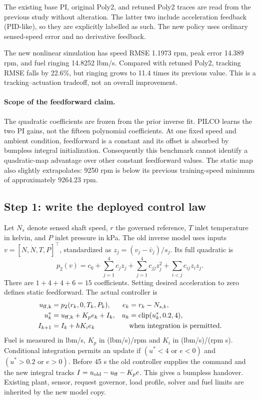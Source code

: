 The existing base PI, original Poly2, and retuned Poly2 traces are read from the previous study without alteration. The latter two include acceleration feedback (PID-like), so they are explicitly labelled as such. The new policy uses ordinary sensed-speed error and no derivative feedback.

The new nonlinear simulation has speed RMSE 1.1973 rpm, peak error 14.389 rpm, and fuel ringing 14.8252 lbm/s. Compared with retuned Poly2, tracking RMSE falls by 22.6\%, but ringing grows to 11.4 times its previous value. This is a tracking--actuation tradeoff, not an overall improvement.

\paragraph{Scope of the feedforward claim.} The quadratic coefficients are frozen from the prior inverse fit. PILCO learns the two PI gains, not the fifteen polynomial coefficients. At one fixed speed and ambient condition, feedforward is a constant and its offset is absorbed by bumpless integral initialization. Consequently this benchmark cannot identify a quadratic-map advantage over other constant feedforward values. The static map also slightly extrapolates: 9250 rpm is below its previous training-speed minimum of approximately 9264.23 rpm.

\subsection{Step 1: write the deployed control law}
Let $N_s$ denote sensed shaft speed, $r$ the governed reference, $T$ inlet temperature in kelvin, and $P$ inlet pressure in kPa. The old inverse model uses inputs $v=[N,\dot N,T,P]^\top$, standardized as $z_j=(v_j-\bar v_j)/s_j$. Its full quadratic is
\begin{equation}
 p_2(v)=c_0+\sum_{j=1}^4c_jz_j+\sum_{j=1}^4c_{jj}z_j^2+\sum_{i<j}c_{ij}z_iz_j.
\end{equation}
There are $1+4+4+6=15$ coefficients. Setting desired acceleration to zero defines static feedforward. The actual controller is
\begin{align}
 u_{\rm ff,k}&=p_2(r_k,0,T_k,P_k), &e_k&=r_k-N_{s,k},\\
 u_k^*&=u_{\rm ff,k}+K_pe_k+I_k, &u_k&=\operatorname{clip}(u_k^*,0.2,4),\\
 I_{k+1}&=I_k+hK_ie_k &&\text{when integration is permitted.}
\end{align}
Fuel is measured in lbm/s, $K_p$ in (lbm/s)/rpm and $K_i$ in (lbm/s)/(rpm s). Conditional integration permits an update if $(u^*<4\text{ or }e<0)$ and $(u^*>0.2\text{ or }e>0)$. Before 45 s the old controller supplies the command and the new integral tracks $I=u_{\rm old}-u_{\rm ff}-K_pe$. This gives a bumpless handover. Existing plant, sensor, request governor, load profile, solver and fuel limits are inherited by the new model copy.

